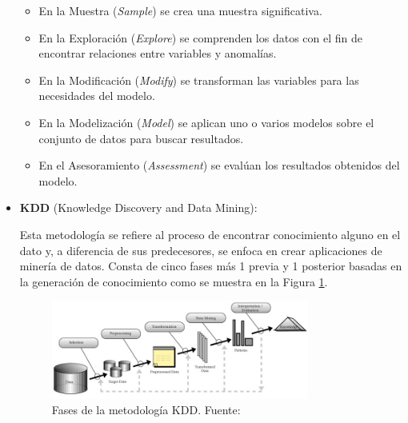 \begin{itemize}
	\begin{itemize}
		\item En la Muestra (\textit{Sample}) se crea una muestra significativa.
		\item En la Exploración (\textit{Explore}) se comprenden los datos con el fin de encontrar relaciones entre variables y anomalías.
		\item En la Modificación (\textit{Modify}) se transforman las variables para las necesidades del modelo.
		\item En la Modelización (\textit{Model}) se aplican uno o varios modelos sobre el conjunto de datos para buscar resultados.
		\item En el Asesoramiento (\textit{Assessment}) se evalúan los resultados obtenidos del modelo.
	\end{itemize}
	
	\item \textbf{KDD} (Knowledge Discovery and Data Mining):
	
	Esta metodología se refiere al proceso de encontrar conocimiento alguno en el dato y, a diferencia de sus predecesores, se enfoca en crear aplicaciones de minería de datos. Consta de cinco fases más 1 previa y 1 posterior basadas en la generación de conocimiento como se muestra en la Figura \ref{2:fig9}.
	\begin{figure}[h]
		\begin{center}
			\includegraphics[width=0.80\textwidth]{2/figures/kdd.jpg}
			\caption{Fases de la metodología KDD. Fuente: \cite{tec_braulio2015metodologiasdm}}
			\label{2:fig9}
		\end{center}
	\end{figure}
	

\end{itemize}
